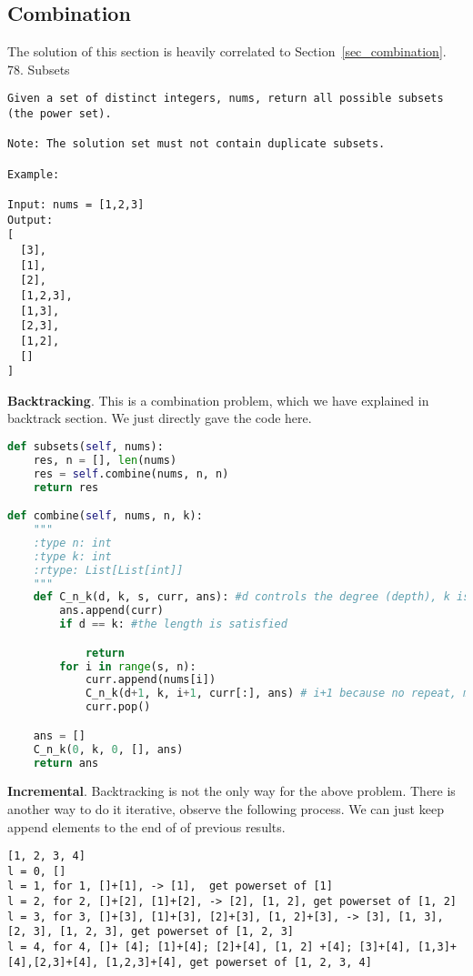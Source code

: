 \documentclass[../main.tex]{subfiles}
\begin{document}
\subsection{Combination}
\label{part4_array_combine}
The solution of this section is heavily correlated to Section~\ref{sec_combination}. 
78. Subsets
\begin{lstlisting}
Given a set of distinct integers, nums, return all possible subsets (the power set).

Note: The solution set must not contain duplicate subsets.

Example:

Input: nums = [1,2,3]
Output:
[
  [3],
  [1],
  [2],
  [1,2,3],
  [1,3],
  [2,3],
  [1,2],
  []
]
\end{lstlisting}
\textbf{Backtracking}. This is a combination problem, which we have explained in backtrack section. We just directly gave the code here. 
\begin{lstlisting}[language = Python]
def subsets(self, nums):
    res, n = [], len(nums)
    res = self.combine(nums, n, n)
    return res

def combine(self, nums, n, k):
    """
    :type n: int
    :type k: int
    :rtype: List[List[int]]
    """
    def C_n_k(d, k, s, curr, ans): #d controls the degree (depth), k is controls the return level, curr saves the current result, ans is all the result
        ans.append(curr)
        if d == k: #the length is satisfied

            return
        for i in range(s, n):
            curr.append(nums[i])
            C_n_k(d+1, k, i+1, curr[:], ans) # i+1 because no repeat, make sure use deep copy curr[:]
            curr.pop()

    ans = []    
    C_n_k(0, k, 0, [], ans) 
    return ans
\end{lstlisting}
\textbf{Incremental}. Backtracking is not the only way for the above problem. There is another way to do it iterative, observe the following process. We can just keep append elements to the end of of previous results. 
\begin{lstlisting}
[1, 2, 3, 4]
l = 0, []
l = 1, for 1, []+[1], -> [1],  get powerset of [1]
l = 2, for 2, []+[2], [1]+[2], -> [2], [1, 2], get powerset of [1, 2]
l = 3, for 3, []+[3], [1]+[3], [2]+[3], [1, 2]+[3], -> [3], [1, 3], [2, 3], [1, 2, 3], get powerset of [1, 2, 3]
l = 4, for 4, []+ [4]; [1]+[4]; [2]+[4], [1, 2] +[4]; [3]+[4], [1,3]+[4],[2,3]+[4], [1,2,3]+[4], get powerset of [1, 2, 3, 4]
\end{lstlisting}
\end{document}
